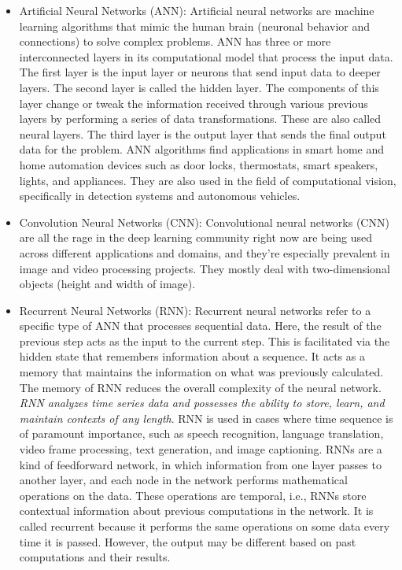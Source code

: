 \documentclass[11pt]{article}
\begin{document}
\begin{itemize}
\item Artificial Neural Networks (ANN): Artificial neural networks are machine learning algorithms that mimic the human brain (neuronal behavior and connections) to solve complex problems. ANN has three or more interconnected layers in its computational model that process the input data. The first layer is the input layer or neurons that send input data to deeper layers. The second layer is called the hidden layer. The components of this layer change or tweak the information received through various previous layers by performing a series of data transformations. These are also called neural layers. The third layer is the output layer that sends the final output data for the problem. ANN algorithms find applications in smart home and home automation devices such as door locks, thermostats, smart speakers, lights, and appliances. They are also used in the field of computational vision, specifically in detection systems and autonomous vehicles.
\item Convolution Neural Networks (CNN): Convolutional neural networks (CNN) are all the rage in the deep learning community right now are being used across different applications and domains, and they’re especially prevalent in image and video processing projects. They mostly deal with two-dimensional objects (height and width of image). 
\item Recurrent Neural Networks (RNN): Recurrent neural networks refer to a specific type of ANN that processes sequential data. Here, the result of the previous step acts as the input to the current step. This is facilitated via the hidden state that remembers information about a sequence. It acts as a memory that maintains the information on what was previously calculated. The memory of RNN reduces the overall complexity of the neural network. \emph{RNN analyzes time series data and possesses the ability to store, learn, and maintain contexts of any length}. RNN is used in cases where time sequence is of paramount importance, such as speech recognition, language translation, video frame processing, text generation, and image captioning. RNNs are a kind of feedforward network, in which information from one layer passes to another layer, and each node in the network performs mathematical operations on the data. These operations are temporal, i.e., RNNs store contextual information about previous computations in the network. It is called recurrent because it performs the same operations on some data every time it is passed. However, the output may be different based on past computations and their results.


\end{itemize} 
\end{document}
